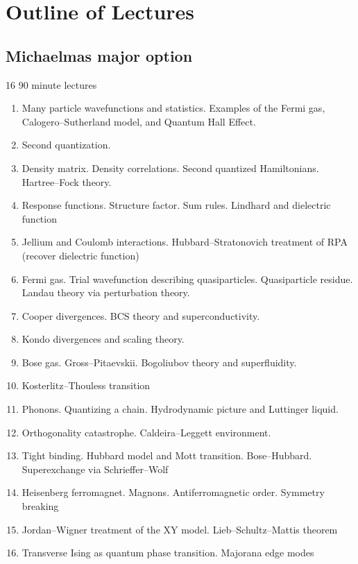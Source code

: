 \section{Outline of Lectures}

\subsection{Michaelmas major option}

16 90 minute lectures

\begin{enumerate}
\item Many particle wavefunctions and statistics. Examples of the Fermi gas, Calogero--Sutherland model, and Quantum Hall Effect.

\item Second quantization. 

\item Density matrix. Density correlations. Second quantized Hamiltonians. Hartree--Fock theory.

\item Response functions. Structure factor. Sum rules. Lindhard and dielectric function

\item Jellium and Coulomb interactions. Hubbard--Stratonovich treatment of RPA (recover dielectric function)

\item Fermi gas. Trial wavefunction describing quasiparticles. Quasiparticle residue. Landau theory via perturbation theory. 

\item Cooper divergences. BCS theory and superconductivity. 

\item Kondo divergences and scaling theory.

\item Bose gas. Gross--Pitaevskii. Bogoliubov theory and superfluidity.

\item Kosterlitz--Thouless transition

\item Phonons. Quantizing a chain. Hydrodynamic picture and Luttinger liquid.

\item Orthogonality catastrophe. Caldeira--Leggett environment.

\item Tight binding. Hubbard model and Mott transition. Bose--Hubbard. Superexchange via Schrieffer--Wolf

\item Heisenberg ferromagnet. Magnons. Antiferromagnetic order. Symmetry breaking

\item Jordan--Wigner treatment of the XY model. Lieb--Schultz--Mattis theorem

\item Transverse Ising as quantum phase transition. Majorana edge modes

\end{enumerate}

